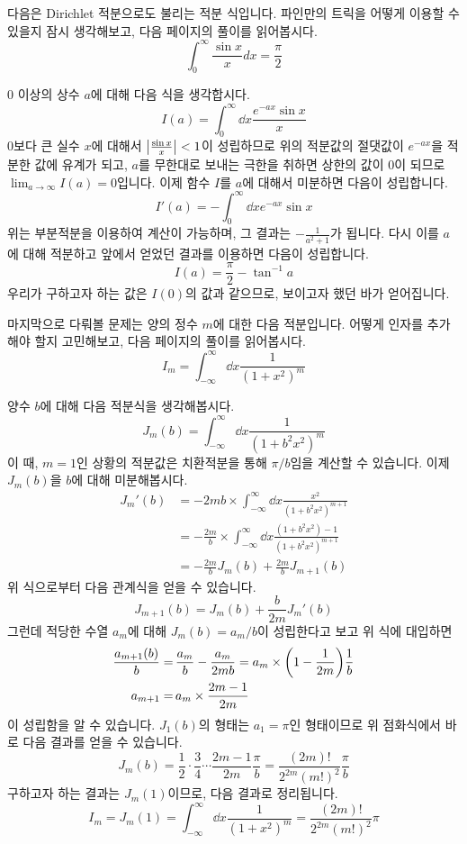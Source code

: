 \documentclass[11pt]{book}
\begin{document}
\begin{MLPar}
\example
다음은 Dirichlet 적분으로도 불리는 적분 식입니다.
파인만의 트릭을 어떻게 이용할 수 있을지 잠시 생각해보고, 다음 페이지의 풀이를 읽어봅시다.
\[\int_{0}^{\infty} \frac{\sin x}{x} d x = \frac{\pi}{2}\]

0 이상의 상수 $a$에 대해 다음 식을 생각합시다.
\[I(a) = \int_{0}^{\infty}\dd{x} \frac{e^{-ax} \sin x}{x}\]
0보다 큰 실수 $x$에 대해서 $\abs{\frac{\sin x}{x}} < 1$이 성립하므로 위의 적분값의 절댓값이 $e^{-ax}$을 적분한 값에 유계가 되고, $a$를 무한대로 보내는 극한을 취하면 상한의 값이 0이 되므로 $\lim_{a \to \infty} I(a) = 0$입니다.
이제 함수 $I$를 $a$에 대해서 미분하면 다음이 성립합니다.
\[I'(a) = - \int_{0}^{\infty}\dd{x} e^{-ax} \sin x\]
위는 부분적분을 이용하여 계산이 가능하며, 그 결과는 $-\frac{1}{a^2 + 1}$가 됩니다.
다시 이를 $a$에 대해 적분하고 앞에서 얻었던 결과를 이용하면 다음이 성립합니다.
\[I(a) = \frac{\pi}{2} - \tan^{-1} a\]
우리가 구하고자 하는 값은 $I(0)$의 값과 같으므로, 보이고자 했던 바가 얻어집니다.

\example
마지막으로 다뤄볼 문제는 양의 정수 $m$에 대한 다음 적분입니다.
어떻게 인자를 추가해야 할지 고민해보고, 다음 페이지의 풀이를 읽어봅시다.
\[I_m = \int_{-\infty}^{\infty}\dd{x} \frac{1}{(1 + x^2)^m}\]

양수 $b$에 대해 다음 적분식을 생각해봅시다.%
\[J_m(b) = \int_{-\infty}^{\infty}\dd{x} \frac{1}{(1 + b^2 x^2)^m}\]
이 때, \(m = 1\)인 상황의 적분값은 치환적분을 통해 $\pi/b$임을 계산할 수 있습니다.
이제 $J_m(b)$을 $b$에 대해 미분해봅시다.
\begin{align*}
    J_m'(b) &= -2mb \times \int_{-\infty}^{\infty}\dd{x} \frac{x^2}{(1 + b^2 x^2)^{m+1}} \\
    &= -\frac{2m}{b} \times \int_{-\infty}^{\infty}\dd{x} \frac{(1 + b^2 x^2) - 1}{(1 + b^2 x^2)^{m+1}} \\
    &= -\frac{2m}{b} J_m(b) + \frac{2m}{b} J_{m+1}(b)
\end{align*}
위 식으로부터 다음 관계식을 얻을 수 있습니다.
\[J_{m+1}(b) = J_m(b) + \frac{b}{2m} J_m'(b)\]
그런데 적당한 수열 $a_m$에 대해 $J_m(b) = a_m/b$이 성립한다고 보고 위 식에 대입하면
\begin{align*}
    \frac{a_{m+1}(b)}{b} =&\, \frac{a_m}{b} - \frac{a_m}{2mb} = a_m \times \pqty{1 - \frac{1}{2m}} \frac{1}{b} \\
    a_{m+1} =&\, a_m \times \frac{2m - 1}{2m}
\end{align*}
이 성립함을 알 수 있습니다.
\(J_1(b)\)의 형태는 \(a_1 = \pi\)인 형태이므로 위 점화식에서 바로 다음 결과를 얻을 수 있습니다.
\[J_m(b) = \frac{1}{2} \cdot \frac{3}{4} \cdots \frac{2m-1}{2m} \frac{\pi}{b} = \frac{(2m)!}{2^{2m} (m!)^2} \frac{\pi}{b}\]
구하고자 하는 결과는 $J_m(1)$이므로, 다음 결과로 정리됩니다.
\[I_m = J_m(1) = \int_{-\infty}^{\infty}\dd{x} \frac{1}{(1 + x^2)^m} = \frac{(2m)!}{2^{2m} (m!)^2} \pi\]
\end{MLPar}
\end{document}
